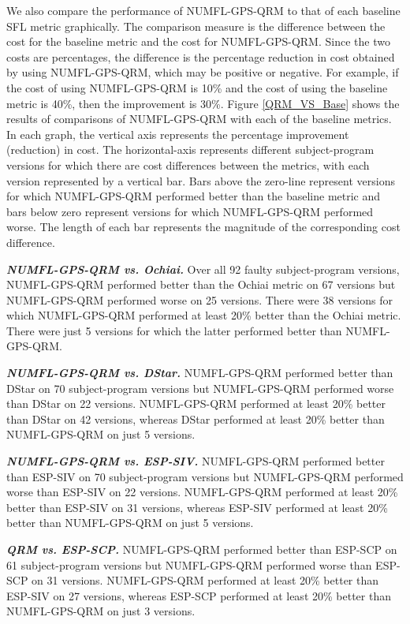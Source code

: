 \documentclass[times]{stvrauth}
\begin{document}
We also compare the performance of NUMFL-GPS-QRM to that of each baseline SFL metric graphically. The comparison measure is the difference between the cost for the baseline metric and the cost for NUMFL-GPS-QRM.  Since the two costs are percentages, the difference is the percentage reduction in cost obtained by using NUMFL-GPS-QRM, which may be positive or negative.  For example, if the cost of using NUMFL-GPS-QRM is 10\% and the cost of using the baseline metric is 40\%, then the improvement is 30\%.  Figure \ref{QRM_VS_Base} shows the results of comparisons of NUMFL-GPS-QRM with each of the baseline metrics.  In each graph, the vertical axis represents the percentage improvement (reduction) in cost. The horizontal-axis represents different subject-program versions for which there are cost differences between the metrics, with each version represented by a vertical bar.   Bars above the zero-line represent versions for which NUMFL-GPS-QRM performed better than the baseline metric and bars below zero represent versions for which NUMFL-GPS-QRM performed worse.  The length of each bar represents the magnitude of the corresponding cost difference.

\textit{\textbf{ NUMFL-GPS-QRM vs. Ochiai.}}  Over all 92 faulty subject-program versions, NUMFL-GPS-QRM performed better than the Ochiai metric on 67 versions but NUMFL-GPS-QRM performed worse on 25 versions.  There were 38 versions for which NUMFL-GPS-QRM performed at least 20\% better than the Ochiai metric.  There were just 5 versions for which the latter performed better than NUMFL-GPS-QRM.

\textit{\textbf{ NUMFL-GPS-QRM vs. DStar.}}  NUMFL-GPS-QRM performed better than DStar on 70 subject-program versions but NUMFL-GPS-QRM performed worse than DStar on 22 versions.  NUMFL-GPS-QRM performed at least 20\% better than DStar on 42 versions, whereas DStar performed at least 20\% better than NUMFL-GPS-QRM on just 5 versions.

\textit{\textbf{ NUMFL-GPS-QRM vs. ESP-SIV.}} NUMFL-GPS-QRM performed better than ESP-SIV on 70 subject-program versions but NUMFL-GPS-QRM performed worse than ESP-SIV on 22 versions.  NUMFL-GPS-QRM performed at least 20\% better than ESP-SIV on 31 versions, whereas ESP-SIV performed at least 20\% better than NUMFL-GPS-QRM on just 5 versions.

\textit{\textbf{ QRM vs. ESP-SCP.}}  NUMFL-GPS-QRM performed better than ESP-SCP on 61 subject-program versions but NUMFL-GPS-QRM performed worse than ESP-SCP on 31 versions.  NUMFL-GPS-QRM performed at least 20\% better than ESP-SIV on 27 versions, whereas ESP-SCP performed at least 20\% better than NUMFL-GPS-QRM on just 3 versions.
\end{document}
